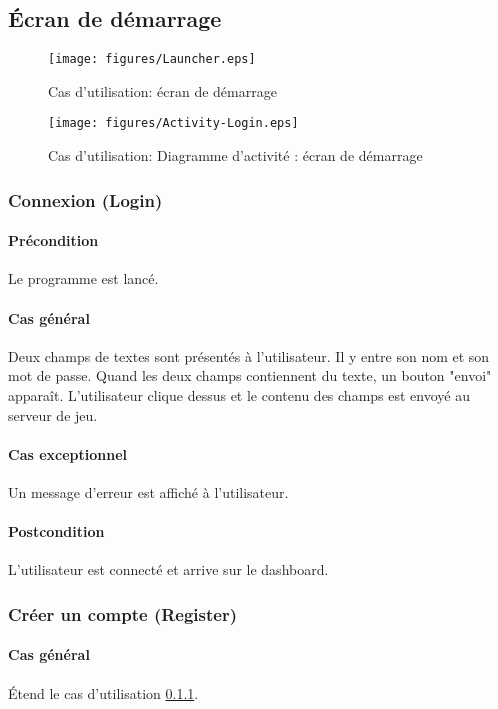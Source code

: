 \subsection{\'Ecran de démarrage}
\begin{figure}[h!]
    \centering
    \texttt{[image: figures/Launcher.eps]}
    \caption{\label{fig:UC:launcher} Cas d'utilisation: écran de démarrage}
\end{figure}
\begin{figure}[h!]
    \centering
    \texttt{[image: figures/Activity-Login.eps]}
    \caption{\label{fig:UC:act-launcher} Cas d'utilisation: Diagramme d'activité : écran de démarrage}
\end{figure}

\subsubsection{Connexion (Login)}
    \label{UC:login}
    \paragraph{Précondition} Le programme est lancé.
    \paragraph{Cas général} Deux champs de textes sont présentés à l'\gls{utilisateur}. Il y entre son nom et son mot de passe. Quand les deux champs contiennent du texte, un bouton "envoi" apparaît. L'utilisateur clique dessus et le contenu des champs est envoyé au serveur de jeu.
    \paragraph{Cas exceptionnel} Un message d'erreur est affiché à l'utilisateur.
    \paragraph{Postcondition} L'utilisateur est connecté et arrive sur le dashboard.

\subsubsection{Créer un compte (Register)}
    \paragraph{Cas général} \'Etend le cas d'utilisation \ref{UC:login}.
